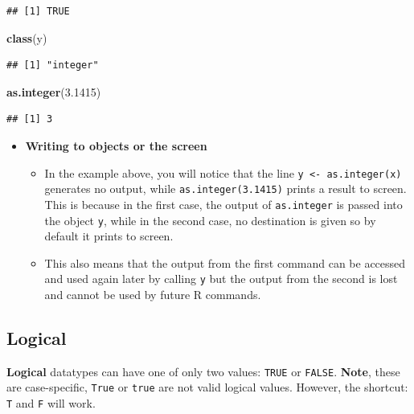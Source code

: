 \documentclass[a4paper]{book}
\newenvironment{Shaded}{\begin{snugshade}}{\end{snugshade}}
\newcommand{\KeywordTok}[1]{\textcolor[rgb]{0.13,0.29,0.53}{\textbf{{#1}}}}
\newcommand{\FloatTok}[1]{\textcolor[rgb]{0.00,0.00,0.81}{{#1}}}
\newcommand{\NormalTok}[1]{{#1}}
\renewenvironment{Shaded}
{\vspace{1.5em}\begin{leftbar}\begin{snugshade}}
{\end{snugshade}\end{leftbar}\vspace{3pt}}
\newenvironment{rmdblock}[1]
  {\vspace{1.5em}\begin{shaded*}
  \begin{itemize}
  \renewcommand{\labelitemi}{
    \raisebox{-.7\height}[0pt][0pt]{
      {\setkeys{Gin}{width=3em,keepaspectratio}\texttt{[image: images/\#1]}}
    }
  }
  \item
  }
  {
  \end{itemize}
  \end{shaded*}
  }
\newenvironment{rmdtip}
  {\begin{rmdblock}{tip}}
  {\end{rmdblock}}
\begin{document}
\begin{verbatim}
## [1] TRUE
\end{verbatim}

\begin{Shaded}
\begin{Highlighting}[]
\KeywordTok{class}\NormalTok{(y)}
\end{Highlighting}
\end{Shaded}

\begin{verbatim}
## [1] "integer"
\end{verbatim}

\begin{Shaded}
\begin{Highlighting}[]
\KeywordTok{as.integer}\NormalTok{(}\FloatTok{3.1415}\NormalTok{)}
\end{Highlighting}
\end{Shaded}

\begin{verbatim}
## [1] 3
\end{verbatim}

\begin{rmdtip}
\textbf{Writing to objects or the screen}

\begin{itemize}
\item
  In the example above, you will notice that the line
  \texttt{y\ \textless{}-\ as.integer(x)} generates no output, while
  \texttt{as.integer(3.1415)} prints a result to screen. This is because
  in the first case, the output of \texttt{as.integer} is passed into
  the object \texttt{y}, while in the second case, no destination is
  given so by default it prints to screen.
\item
  This also means that the output from the first command can be accessed
  and used again later by calling \texttt{y} but the output from the
  second is lost and cannot be used by future R commands.
\end{itemize}
\end{rmdtip}

\subsection{Logical}\label{logical}

\textbf{Logical} datatypes can have one of only two values:
\texttt{TRUE} or \texttt{FALSE}. \textbf{Note}, these are case-specific,
\texttt{True} or \texttt{true} are not valid logical values. However,
the shortcut: \texttt{T} and \texttt{F} will work.
\end{document}
